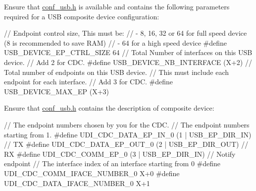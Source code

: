 \begin{DoxyEnumerate}
\item Ensure that \hyperlink{conf__usb_8h}{conf\-\_\-usb.\-h} is available and contains the following parameters required for a U\-S\-B composite device configuration\-:
\begin{DoxyItemize}
\item 
\begin{DoxyCode}
 \textcolor{comment}{// Endpoint control size, This must be:}
        \textcolor{comment}{// - 8, 16, 32 or 64 for full speed device (8 is recommended to save
       RAM)}
        \textcolor{comment}{// - 64 for a high speed device}
\textcolor{preprocessor}{        #define USB\_DEVICE\_EP\_CTRL\_SIZE  64}
\textcolor{preprocessor}{}        \textcolor{comment}{// Total Number of interfaces on this USB device.}
        \textcolor{comment}{// Add 2 for CDC.}
\textcolor{preprocessor}{        #define USB\_DEVICE\_NB\_INTERFACE (X+2)}
\textcolor{preprocessor}{}        \textcolor{comment}{// Total number of endpoints on this USB device.}
        \textcolor{comment}{// This must include each endpoint for each interface.}
        \textcolor{comment}{// Add 3 for CDC.}
\textcolor{preprocessor}{        #define USB\_DEVICE\_MAX\_EP (X+3) }
\end{DoxyCode}

\end{DoxyItemize}
\item Ensure that \hyperlink{conf__usb_8h}{conf\-\_\-usb.\-h} contains the description of composite device\-:
\begin{DoxyItemize}
\item 
\begin{DoxyCode}
 \textcolor{comment}{// The endpoint numbers chosen by you for the CDC.}
        \textcolor{comment}{// The endpoint numbers starting from 1.}
\textcolor{preprocessor}{        #define  UDI\_CDC\_DATA\_EP\_IN\_0            (1 | USB\_EP\_DIR\_IN)  // TX}
\textcolor{preprocessor}{}\textcolor{preprocessor}{        #define  UDI\_CDC\_DATA\_EP\_OUT\_0           (2 | USB\_EP\_DIR\_OUT) // RX}
\textcolor{preprocessor}{}\textcolor{preprocessor}{        #define  UDI\_CDC\_COMM\_EP\_0               (3 | USB\_EP\_DIR\_IN)  // Notify
       endpoint}
\textcolor{preprocessor}{}        \textcolor{comment}{// The interface index of an interface starting from 0}
\textcolor{preprocessor}{        #define  UDI\_CDC\_COMM\_IFACE\_NUMBER\_0     X+0}
\textcolor{preprocessor}{        #define  UDI\_CDC\_DATA\_IFACE\_NUMBER\_0     X+1 }
\end{DoxyCode}


\end{DoxyItemize}
\end{DoxyEnumerate}
